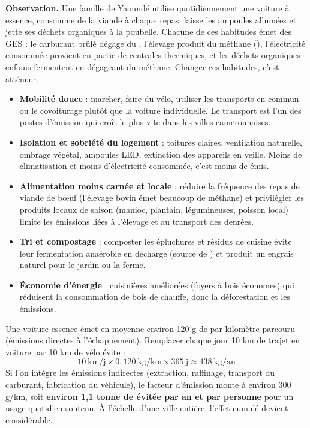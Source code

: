 \documentclass[11pt]{article}
\newcounter{popsec}
\newcounter{popsub}
\newcommand{\courssub}[1]{%
  \stepcounter{popsub}%
  \par\vspace{9pt}\noindent{\popxbold\fontsize{11.5}{13}\selectfont\color{popink}{\color{poporange}\thepopsec.\thepopsub}\hspace{6pt}#1}\par\nopagebreak\vspace{4pt}
}
\begin{document}
\courssub{Les gestes individuels : agir à son échelle}

\textbf{Observation.} Une famille de Yaoundé utilise quotidiennement une voiture à essence, consomme de la viande à chaque repas, laisse les ampoules allumées et jette ses déchets organiques à la poubelle. Chacune de ces habitudes émet des GES : le carburant brûlé dégage du , l'élevage produit du méthane (), l'électricité consommée provient en partie de centrales thermiques, et les déchets organiques enfouis fermentent en dégageant du méthane. Changer ces habitudes, c'est atténuer.

\begin{exemplebox}
\begin{itemize}
\item \textbf{Mobilité douce} : marcher, faire du vélo, utiliser les transports en commun ou le covoiturage plutôt que la voiture individuelle. Le transport est l'un des postes d'émission qui croît le plus vite dans les villes camerounaises.
\item \textbf{Isolation et sobriété du logement} : toitures claires, ventilation naturelle, ombrage végétal, ampoules LED, extinction des appareils en veille. Moins de climatisation et moins d'électricité consommée, c'est moins de  émis.
\item \textbf{Alimentation moins carnée et locale} : réduire la fréquence des repas de viande de bœuf (l'élevage bovin émet beaucoup de méthane) et privilégier les produits locaux de saison (manioc, plantain, légumineuses, poisson local) limite les émissions liées à l'élevage et au transport des denrées.
\item \textbf{Tri et compostage} : composter les épluchures et résidus de cuisine évite leur fermentation anaérobie en décharge (source de ) et produit un engrais naturel pour le jardin ou la ferme.
\item \textbf{Économie d'énergie} : cuisinières améliorées (foyers à bois économes) qui réduisent la consommation de bois de chauffe, donc la déforestation et les émissions.
\end{itemize}
\end{exemplebox}

\begin{exemplebox}
Une voiture essence émet en moyenne environ 120 g de  par kilomètre parcouru (émissions directes à l'échappement). Remplacer chaque jour 10 km de trajet en voiture par 10 km de vélo évite :
\[ 10\ \text{km/j} \times 0{,}120\ \text{kg/km} \times 365\ \text{j} \approx 438\ \text{kg/an} \]
Si l'on intègre les émissions indirectes (extraction, raffinage, transport du carburant, fabrication du véhicule), le facteur d'émission monte à environ 300 g/km, soit \textbf{environ 1,1 tonne de  évitée par an et par personne} pour un usage quotidien soutenu. À l'échelle d'une ville entière, l'effet cumulé devient considérable.
\end{exemplebox}
\end{document}
